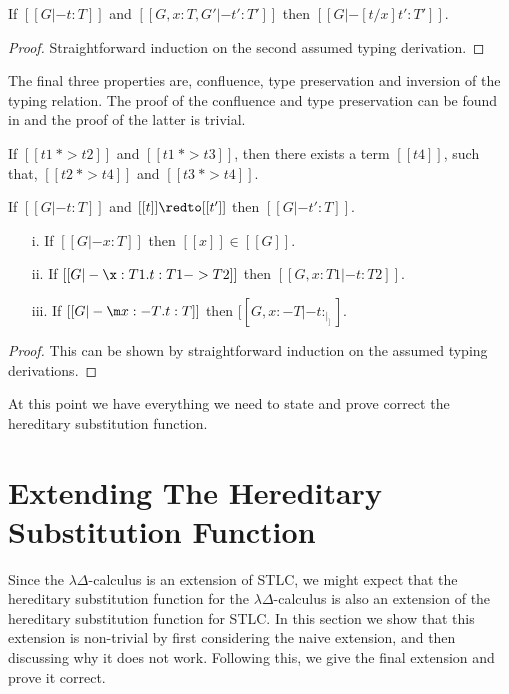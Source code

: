 \begin{lemma}
  \label{lemma:substitution_for_typing}
  If $[[G |- t : T]]$ and $[[G,x:T,G' |- t':T']]$ then $[[G |- [t/x]t':T']]$.
\end{lemma}
\begin{proof}
  Straightforward induction on the second assumed typing derivation.
\end{proof}
\noindent
The final three properties are, confluence, type preservation and inversion of the typing
relation. The proof of the confluence and type preservation can be found in \cite{Rehof:1994}
and the proof of the latter is trivial.

\begin{thm}[Confluence]
  \label{thm:confluence}
  If $[[t1 ~*> t2]]$ and $[[t1 ~*> t3]]$, then there exists a term $[[t4]]$, such that,
  $[[t2 ~*> t4]]$ and $[[t3 ~*> t4]]$.
\end{thm}

\begin{thm}[Preservation]
  \label{thm:preservation}
  If $[[G |- t : T]]$ and $[[t]] \redto [[t']]$ then $[[G |- t' : T]]$.
\end{thm}

\begin{thm}[Inversion]
  \label{theorem:inversion}
  \begin{itemize}
  \item[i.] If $[[G |- x : T]]$ then $[[x]] \in [[G]]$.
  \item[ii.] If $[[G |- \x:T1.t:T1->T2]]$ then $[[G, x:T1 |- t:T2]]$.
  \item[iii.] If $[[G |- \m x:{-T}.t:T]]$ then $[[G, x:{-T} |- t: _|_]]$.
  \end{itemize}
\end{thm}
\begin{proof}
  This can be shown by straightforward induction on the assumed typing derivations.
\end{proof}
\noindent
At this point we have everything we need to state and prove correct
the hereditary substitution function.

\section{Extending The Hereditary Substitution Function}
\label{sec:the_hereditary_substitution_function_for_the_ld-calculus}
Since the $\lambda\Delta$-calculus is an extension of
STLC, we might expect that 
the hereditary substitution function for the $\lambda\Delta$-calculus is also an extension of the
hereditary substitution function for STLC.  In this section we show that this extension is
non-trivial by first considering the naive extension, and then discussing why it does not work.
Following this, we give the final extension and prove it correct.

